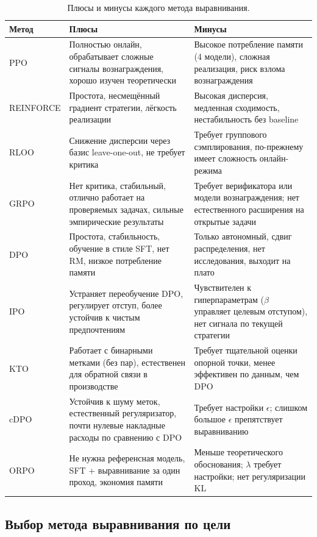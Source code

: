 \begin{table}[ht]
\centering
\caption{Плюсы и минусы каждого метода выравнивания.}
\label{tab:alignment-pros-cons}
\footnotesize
\begin{tabular}{@{}lp{3.5cm}p{3.5cm}@{}}
\toprule
\textbf{Метод} & \textbf{Плюсы} & \textbf{Минусы} \\
\midrule
PPO
  & Полностью онлайн, обрабатывает сложные сигналы вознаграждения, хорошо изучен теоретически
  & Высокое потребление памяти (4 модели), сложная реализация, риск взлома вознаграждения \\
\midrule
REINFORCE
  & Простота, несмещённый градиент стратегии, лёгкость реализации
  & Высокая дисперсия, медленная сходимость, нестабильность без baseline \\
\midrule
RLOO
  & Снижение дисперсии через базис leave-one-out, не требует критика
  & Требует группового сэмплирования, по-прежнему имеет сложность онлайн-режима \\
\midrule
GRPO
  & Нет критика, стабильный, отлично работает на проверяемых задачах, сильные эмпирические результаты
  & Требует верификатора или модели вознаграждения; нет естественного расширения на открытые задачи \\
\midrule
DPO
  & Простота, стабильность, обучение в стиле SFT, нет RM, низкое потребление памяти
  & Только автономный, сдвиг распределения, нет исследования, выходит на плато \\
\midrule
IPO
  & Устраняет переобучение DPO, регулирует отступ, более устойчив к чистым предпочтениям
  & Чувствителен к гиперпараметрам ($\beta$ управляет целевым отступом), нет сигнала по текущей стратегии \\
\midrule
KTO
  & Работает с бинарными метками (без пар), естественен для обратной связи в производстве
  & Требует тщательной оценки опорной точки, менее эффективен по данным, чем DPO \\
\midrule
cDPO
  & Устойчив к шуму меток, естественный регуляризатор, почти нулевые накладные расходы по сравнению с DPO
  & Требует настройки $\epsilon$; слишком большое $\epsilon$ препятствует выравниванию \\
\midrule
ORPO
  & Не нужна референсная модель, SFT + выравнивание за один проход, экономия памяти
  & Меньше теоретического обоснования; $\lambda$ требует настройки; нет регуляризации KL \\
\bottomrule
\end{tabular}
\end{table}

\subsection{Выбор метода выравнивания по цели}

